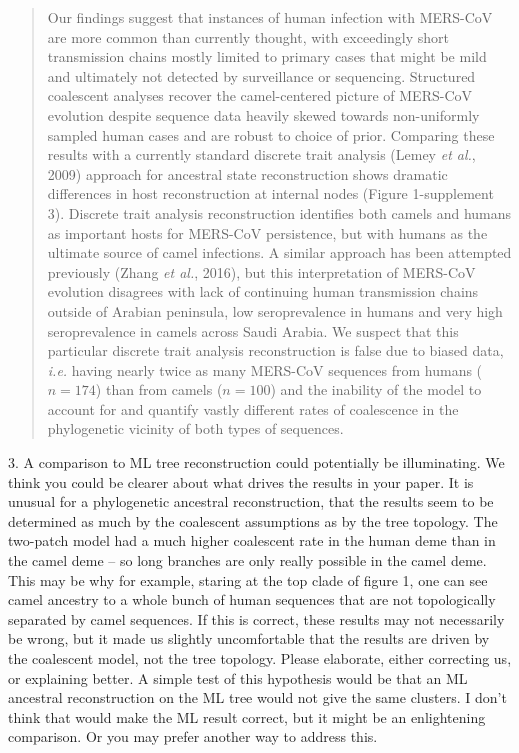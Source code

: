 \documentclass[11pt,oneside,letterpaper]{article}
\begin{document}
\begin{quotation}
Our findings suggest that instances of human infection with MERS-CoV are more common than currently thought, with exceedingly short transmission chains mostly limited to primary cases that might be mild and ultimately not detected by surveillance or sequencing.
Structured coalescent analyses recover the camel-centered picture of MERS-CoV evolution despite sequence data heavily skewed towards non-uniformly sampled human cases and are robust to choice of prior.
Comparing these results with a currently standard discrete trait analysis (Lemey \textit{et al.}, 2009) approach for ancestral state reconstruction shows dramatic differences in host reconstruction at internal nodes (Figure 1-supplement 3).
Discrete trait analysis reconstruction identifies both camels and humans as important hosts for MERS-CoV persistence, but with humans as the ultimate source of camel infections.
A similar approach has been attempted previously (Zhang \textit{et al.}, 2016), but this interpretation of MERS-CoV evolution disagrees with lack of continuing human transmission chains outside of Arabian peninsula, low seroprevalence in humans and very high seroprevalence in camels across Saudi Arabia.
We suspect that this particular discrete trait analysis reconstruction is false due to biased data, \textit{i.e.} having nearly twice as many MERS-CoV sequences from humans ($n=174$) than from camels ($n=100$) and the inability of the model to account for and quantify vastly different rates of coalescence in the phylogenetic vicinity of both types of sequences.
\end{quotation}

3. A comparison to ML tree reconstruction could potentially be illuminating. We think you could be clearer about what drives the results in your paper. It is unusual for a phylogenetic ancestral reconstruction, that the results seem to be determined as much by the coalescent assumptions as by the tree topology. The two-patch model had a much higher coalescent rate in the human deme than in the camel deme -- so long branches are only really possible in the camel deme. This may be why for example, staring at the top clade of figure 1, one can see camel ancestry to a whole bunch of human sequences that are not topologically separated by camel sequences. If this is correct, these results may not necessarily be wrong, but it made us slightly uncomfortable that the results are driven by the coalescent model, not the tree topology. Please elaborate, either correcting us, or explaining better. A simple test of this hypothesis would be that an ML ancestral reconstruction on the ML tree would not give the same clusters. I don't think that would make the ML result correct, but it might be an enlightening comparison. Or you may prefer another way to address this.
\end{document}
